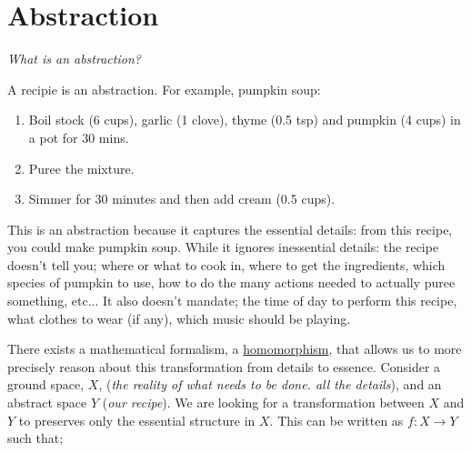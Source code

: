 \chapter{Abstraction}\label{C:abstraction}


\begin{displayquote}
 \textit{What is an abstraction?}
\end{displayquote}

A recipie is an abstraction. For example, pumpkin soup:

\begin{enumerate}
\tightlist
\item Boil stock (6 cups), garlic (1 clove), thyme (0.5 tsp) and pumpkin (4 cups) in a pot for 30 mins.
\item Puree the mixture.
\item Simmer for 30 minutes and then add cream (0.5 cups).
\end{enumerate}

This is an abstraction because it captures the essential details: from this recipe, you could make pumpkin soup.
While it ignores inessential details: the recipe doesn't tell you; where or what to cook in, where to get the
ingredients, which species of pumpkin to use, how to do the many actions needed to actually puree something, etc...
It also doesn't mandate; the time of day to perform this recipe, what clothes to wear (if any),
which music should be playing.


\vspace{5mm}

There exists a mathematical formalism, a  \href{https://en.wikipedia.org/wiki/Homomorphism}{homomorphism},
that allows us to more precisely reason about this transformation from
details to essence. Consider a ground space, $X$, (\textit{the reality of what
needs to be done. all the details}), and an abstract space $Y$ (\textit{our recipe}).
We are looking for a transformation between $X$ and $Y$ to preserves only the essential
structure in $X$. This can be written as $f: X\to Y$ such that;

